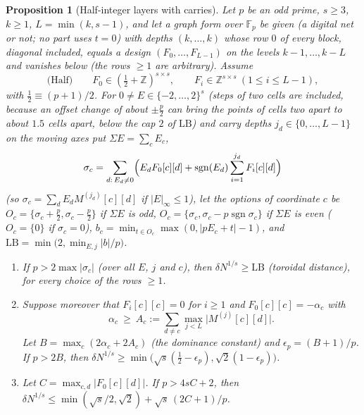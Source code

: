 \documentclass[11pt]{amsart}
\newtheorem{proposition}[theorem]{Proposition}
\theoremstyle{definition}
\theoremstyle{plain}
\newcommand{\Z}{\mathbb{Z}}
\newcommand{\F}{\mathbb{F}}
\DeclareMathOperator{\sgn}{sgn}
\begin{document}
\begin{proposition}[Half-integer layers with carries]\label{prop:Hk}
Let $p$ be an odd prime, $s\ge3$, $k\ge1$, $L=\min(k,s-1)$, and let a graph form over $\F_p$ be given (a digital net or not; no part uses $t=0$) with depths $(k,\dots,k)$ whose row $0$ of every block, diagonal included, equals a design $(F_0,\dots,F_{L-1})$ on the levels $k-1,\dots,k-L$ and vanishes below (the rows $\ge1$ are arbitrary). Assume
\[
\text{(Half)}\qquad F_0\in(\tfrac12+\Z)^{s\times s},\qquad F_i\in\Z^{s\times s}\ (1\le i\le L-1),
\]
with $\frac12\equiv(p+1)/2$. For $0\ne E\in\{-2,\dots,2\}^s$ (steps of two cells are included, because an offset change of about $\pm\frac p2$ can bring the points of cells two apart to about $1.5$ cells apart, below the cap $2$ of $\mathrm{LB}$) and carry depths $j_d\in\{0,\dots,L-1\}$ on the moving axes put $\Sigma E=\sum_cE_c$,
\[
\sigma_c=\sum_{d:\,E_d\ne0}\Bigl(E_dF_0[c][d]+\sgn(E_d)\sum_{i=1}^{j_d}F_i[c][d]\Bigr)
\]
(so $\sigma_c=\sum_dE_dM^{(j_d)}[c][d]$ if $|E|_\infty\le1$), let the \emph{options} of coordinate $c$ be $O_c=\{\sigma_c+\frac p2,\sigma_c-\frac p2\}$ if $\Sigma E$ is odd, $O_c=\{\sigma_c,\sigma_c-p\sgn\sigma_c\}$ if $\Sigma E$ is even ($O_c=\{0\}$ if $\sigma_c=0$), $b_c=\min_{t\in O_c}\max(0,|pE_c+t|-1)$, and $\mathrm{LB}=\min\bigl(2,\min_{E,j}|b|/p\bigr)$.
\begin{enumerate}
\item If $p>2\max|\sigma_c|$ (over all $E$, $j$ and $c$), then $\delta N^{1/s}\ge\mathrm{LB}$ (toroidal distance), for every choice of the rows $\ge1$.
\item Suppose moreover that $F_i[c][c]=0$ for $i\ge1$ and $F_0[c][c]=-\alpha_c$ with
\[
\alpha_c\ \ge\ A_c:=\sum_{d\ne c}\max_{j<L}\bigl|M^{(j)}[c][d]\bigr|.
\]
Let $B=\max_c(2\alpha_c+2A_c)$ (the dominance constant) and $\epsilon_p=(B+1)/p$. If $p>2B$, then $\delta N^{1/s}\ge\min\bigl(\sqrt s(\frac12-\epsilon_p),\sqrt2(1-\epsilon_p)\bigr)$.
\item Let $C=\max_{c,d}|F_0[c][d]|$. If $p>4sC+2$, then $\delta N^{1/s}\le\min(\sqrt s/2,\sqrt2)+\sqrt s\,(2C+1)/p$.
\end{enumerate}
\end{proposition}
\end{document}

